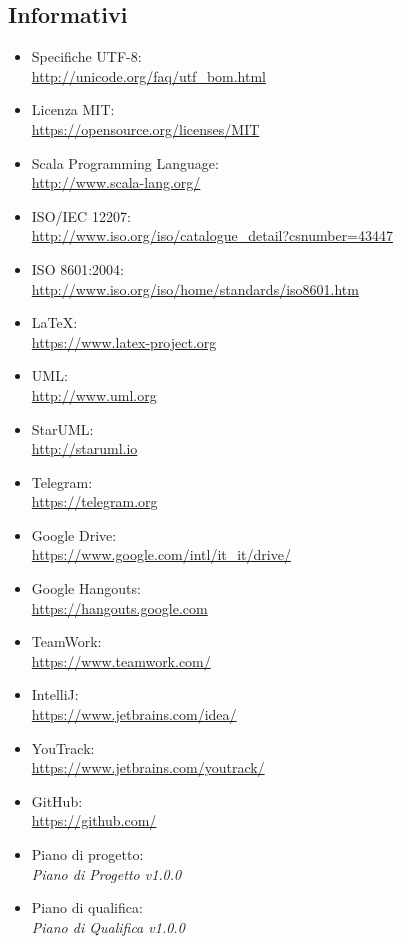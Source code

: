 \documentclass[a4paper]{report}
\begin{document}
	\subsection{Informativi}
	\begin{itemize}
		\item Specifiche UTF-8: \\ \url{http://unicode.org/faq/utf_bom.html}
		\item Licenza MIT: \\ \url{https://opensource.org/licenses/MIT}
		\item Scala Programming Language: \\ \url{http://www.scala-lang.org/}
		\item ISO/IEC 12207: \\ \url{http://www.iso.org/iso/catalogue_detail?csnumber=43447}
		\item ISO 8601:2004: \\ \url{http://www.iso.org/iso/home/standards/iso8601.htm}
		\item \LaTeX: \\ \url{https://www.latex-project.org}
		\item UML: \\ \url{http://www.uml.org}
		\item StarUML: \\ \url{http://staruml.io}
		\item Telegram: \\ \url{https://telegram.org}
		\item Google Drive: \\ \url{https://www.google.com/intl/it_it/drive/}
		\item Google Hangouts: \\ \url{https://hangouts.google.com}
		\item TeamWork: \\ \url{https://www.teamwork.com/}
		\item IntelliJ: \\ \url{https://www.jetbrains.com/idea/}
		\item YouTrack: \\ \url{https://www.jetbrains.com/youtrack/}
		\item GitHub: \\ \url{https://github.com/}
		\item Piano di progetto: \\ \emph{Piano di Progetto v1.0.0}
		\item Piano di qualifica: \\ \emph{Piano di Qualifica v1.0.0}
	\end{itemize}
\end{document}
